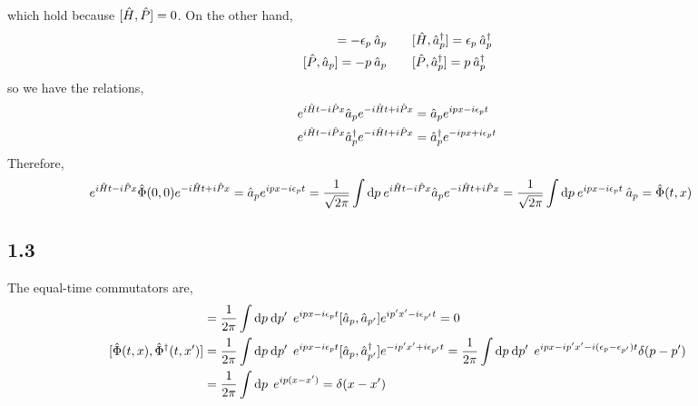 \documentclass[12pt]{extarticle}
\begin{document}
which hold because $[\hat{H}, \hat{P}] = 0$. 
On the other hand,
\begin{align*}
[\hamilt, \a_p] = - \epsilon_p \: \a_p \quad & \quad [\hamilt, \adag_p] = \epsilon_p \: \adag_p 
\\
[\hat{P}, \a_p] = - p \: \a_p \quad & \quad [\hat{P}, \adag_p] = p \: \adag_p 
\end{align*}
so we have the relations,
\begin{align*}
e^{i \hat{H} t - i \hat{P} x} \hat{a}_p e^{- i \hat{H} t + i \hat{P} x} & = \hat{a}_p e^{i p x - i \epsilon_p t} 
\\
e^{i \hat{H} t - i \hat{P} x} \hat{a}^\dagger_p e^{- i \hat{H} t + i \hat{P} x} & = \hat{a}^\dagger_p e^{- i p x + i \epsilon_p t}
\end{align*}
Therefore,
\begin{align*}
e^{i \hat{H} t - i \hat{P} x} \hat{\Phi}(0, 0) e^{- i \hat{H} t + i \hat{P} x} & = \hat{a}_p e^{i p x - i \epsilon_p t} = \frac{1}{\sqrt{2 \pi}} \int \mathrm{d}p \:  e^{i \hat{H} t - i \hat{P} x} \hat{a}_p e^{- i \hat{H} t + i \hat{P} x} = \frac{1}{\sqrt{2 \pi}} \int \mathrm{d}p \: e^{i p x - i \epsilon_p t} \: \hat{a}_p = \hat{\Phi}(t, x) 
\end{align*}
\subsection*{1.3}
The equal-time commutators are,
\begin{align*}
[ \field(t, x), \field(t, x')] & = \frac{1}{2\pi} \int \d{p} \d{p'} \: e^{i p x - i \epsilon_p t} [\a_p, \a_{p'}] e^{i p' x' - i \epsilon_{p'} t} = 0 \\
[ \field(t, x), \dfield(t, x')] & = \frac{1}{2\pi} \int \d{p} \d{p'} \: e^{i p x - i \epsilon_p t} [\a_p, \adag_{p'}] e^{-i p' x' + i \epsilon_{p'} t} = \frac{1}{2\pi} \int \d{p} \d{p'} \: e^{i p x - i p' x' - i (\epsilon_p - \epsilon_{p'}) t} \delta(p - p')
\\
& = \frac{1}{2\pi} \int \d{p} \: e^{i p (x - x')} = \delta(x - x')
\end{align*}
\end{document}

